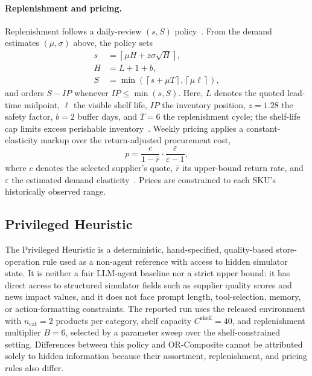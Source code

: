 \paragraph{Replenishment and pricing.}
Replenishment follows a daily-review $(s,S)$ policy~\citep{silver2017inventory}. From the demand estimates $(\mu,\sigma)$ above, the policy sets
\begin{equation}
\begin{aligned}
s &= \left\lceil \mu H + z\sigma\sqrt{H} \right\rceil,\\
H &= L+1+b,\\
S &= \min\left(
\left\lceil s+\mu T \right\rceil,
\left\lceil \mu\ell \right\rceil
\right),
\end{aligned}
\end{equation}
and orders $S-IP$ whenever $IP\leq\min(s,S)$. Here, $L$ denotes the quoted lead-time midpoint, $\ell$ the visible shelf life, $IP$ the inventory position, $z=1.28$ the safety factor, $b=2$ buffer days, and $T=6$ the replenishment cycle; the shelf-life cap limits excess perishable inventory~\citep{nahmias1982perishable}. Weekly pricing applies a constant-elasticity markup over the return-adjusted procurement cost,
\begin{equation}
p = \frac{c}{1-\bar r}
\cdot \frac{\varepsilon}{\varepsilon-1},
\end{equation}
where $c$ denotes the selected supplier's quote, $\bar r$ its upper-bound return rate, and $\varepsilon$ the estimated demand elasticity~\citep{phillips2021pricing}. Prices are constrained to each SKU's historically observed range.

\subsection{Privileged Heuristic}
\label{appendix:handcrafted_policy}

The Privileged Heuristic is a deterministic, hand-specified, quality-based store-operation rule used as a non-agent reference with access to hidden simulator state. It is neither a fair LLM-agent baseline nor a strict upper bound: it has direct access to structured simulator fields such as supplier quality scores and news impact values, and it does not face prompt length, tool-selection, memory, or action-formatting constraints. The reported run uses the released environment with $n_{\mathrm{cat}}=2$ products per category, shelf capacity $C^{\mathrm{shelf}}=40$, and replenishment multiplier $B=6$, selected by a parameter sweep over the shelf-constrained setting. Differences between this policy and OR-Composite cannot be attributed solely to hidden information because their assortment, replenishment, and pricing rules also differ.
